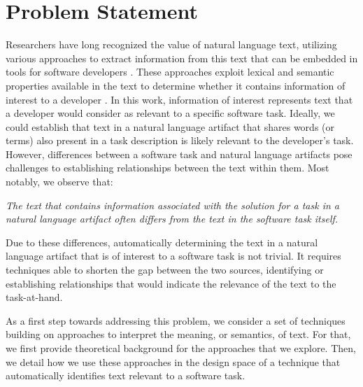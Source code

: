 
\section{Problem Statement}
\label{cp5:motivation}





Researchers have long recognized the value of natural language
text, utilizing various approaches to extract
information from this text that can be embedded in
tools for software developers .
These approaches exploit lexical and semantic properties available in the text to determine 
whether it contains information of interest to a developer . 
In this work, information of interest represents text that a developer would consider as relevant to a specific software task. Ideally, we could establish that text in a natural language artifact that shares  
words (or terms) also present in a task description is likely relevant to the developer's task. However, differences between a software task and natural language artifacts pose challenges to establishing relationships between the text within them. Most notably, we observe that:



\medskip
\begin{bluequote}
    \textit{The text  that contains information associated with the solution for a task in a natural language artifact often differs from the text in the software task itself.}
\end{bluequote}



Due to these differences, automatically determining the text in a natural language artifact that is of interest to a software task is not trivial. 
It requires techniques able to shorten the gap between the two sources, identifying or establishing relationships that would indicate the relevance of the text to the task-at-hand.


As a first step towards addressing this problem, we consider a set of techniques
 building on approaches to interpret the meaning, or semantics, of text.
 For that, we first provide theoretical background for the approaches that we explore. Then, we detail how we use these approaches in the design space of a technique that automatically identifies text relevant to a software task.







